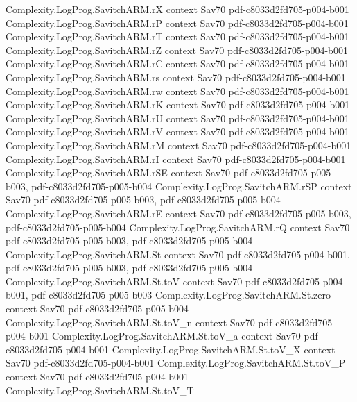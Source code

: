 \begin{theorem}
\proofstep
  {Complexity.LogProg.SavitchARM.rX}
  {context}
  {Sav70}
  {pdf-c8033d2fd705-p004-b001}
\proofstep
  {Complexity.LogProg.SavitchARM.rP}
  {context}
  {Sav70}
  {pdf-c8033d2fd705-p004-b001}
\proofstep
  {Complexity.LogProg.SavitchARM.rT}
  {context}
  {Sav70}
  {pdf-c8033d2fd705-p004-b001}
\proofstep
  {Complexity.LogProg.SavitchARM.rZ}
  {context}
  {Sav70}
  {pdf-c8033d2fd705-p004-b001}
\proofstep
  {Complexity.LogProg.SavitchARM.rC}
  {context}
  {Sav70}
  {pdf-c8033d2fd705-p004-b001}
\proofstep
  {Complexity.LogProg.SavitchARM.rs}
  {context}
  {Sav70}
  {pdf-c8033d2fd705-p004-b001}
\proofstep
  {Complexity.LogProg.SavitchARM.rw}
  {context}
  {Sav70}
  {pdf-c8033d2fd705-p004-b001}
\proofstep
  {Complexity.LogProg.SavitchARM.rK}
  {context}
  {Sav70}
  {pdf-c8033d2fd705-p004-b001}
\proofstep
  {Complexity.LogProg.SavitchARM.rU}
  {context}
  {Sav70}
  {pdf-c8033d2fd705-p004-b001}
\proofstep
  {Complexity.LogProg.SavitchARM.rV}
  {context}
  {Sav70}
  {pdf-c8033d2fd705-p004-b001}
\proofstep
  {Complexity.LogProg.SavitchARM.rM}
  {context}
  {Sav70}
  {pdf-c8033d2fd705-p004-b001}
\proofstep
  {Complexity.LogProg.SavitchARM.rI}
  {context}
  {Sav70}
  {pdf-c8033d2fd705-p004-b001}
\proofstep
  {Complexity.LogProg.SavitchARM.rSE}
  {context}
  {Sav70}
  {pdf-c8033d2fd705-p005-b003,
    pdf-c8033d2fd705-p005-b004}
\proofstep
  {Complexity.LogProg.SavitchARM.rSP}
  {context}
  {Sav70}
  {pdf-c8033d2fd705-p005-b003,
    pdf-c8033d2fd705-p005-b004}
\proofstep
  {Complexity.LogProg.SavitchARM.rE}
  {context}
  {Sav70}
  {pdf-c8033d2fd705-p005-b003,
    pdf-c8033d2fd705-p005-b004}
\proofstep
  {Complexity.LogProg.SavitchARM.rQ}
  {context}
  {Sav70}
  {pdf-c8033d2fd705-p005-b003,
    pdf-c8033d2fd705-p005-b004}
\proofstep
  {Complexity.LogProg.SavitchARM.St}
  {context}
  {Sav70}
  {pdf-c8033d2fd705-p004-b001,
    pdf-c8033d2fd705-p005-b003,
    pdf-c8033d2fd705-p005-b004}
\proofstep
  {Complexity.LogProg.SavitchARM.St.toV}
  {context}
  {Sav70}
  {pdf-c8033d2fd705-p004-b001,
    pdf-c8033d2fd705-p005-b003}
\proofstep
  {Complexity.LogProg.SavitchARM.St.zero}
  {context}
  {Sav70}
  {pdf-c8033d2fd705-p005-b004}
\proofstep
  {Complexity.LogProg.SavitchARM.St.toV_n}
  {context}
  {Sav70}
  {pdf-c8033d2fd705-p004-b001}
\proofstep
  {Complexity.LogProg.SavitchARM.St.toV_a}
  {context}
  {Sav70}
  {pdf-c8033d2fd705-p004-b001}
\proofstep
  {Complexity.LogProg.SavitchARM.St.toV_X}
  {context}
  {Sav70}
  {pdf-c8033d2fd705-p004-b001}
\proofstep
  {Complexity.LogProg.SavitchARM.St.toV_P}
  {context}
  {Sav70}
  {pdf-c8033d2fd705-p004-b001}
\proofstep
  {Complexity.LogProg.SavitchARM.St.toV_T}

\end{theorem}
